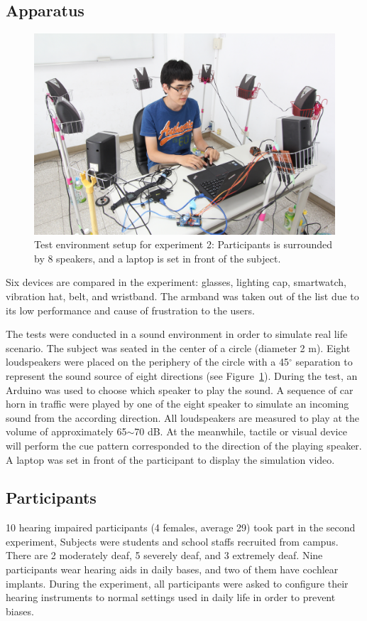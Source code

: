 \documentclass{sigchi}
\begin{document}
\subsection{Apparatus}

\begin{figure}[!t]
\centering
\includegraphics[width=0.9\columnwidth]{Speakers}
\caption{Test environment setup for experiment 2: Participants is surrounded by 8 speakers, and a laptop is set in front of the subject.}
\label{fig:speakers}
\end{figure}
Six devices are compared in the experiment: glasses, lighting cap, smartwatch, vibration hat, belt, and wristband. The armband was taken out of the list due to its low performance and cause of frustration to the users.

The tests were conducted in a sound environment in order to simulate real life scenario. The subject was seated in the center of a circle (diameter 2 m). Eight loudspeakers were placed on the periphery of the circle with a 45$^\circ$ separation to represent the sound source of eight directions (see Figure~\ref{fig:speakers}). During the test, an Arduino was used to choose which speaker to play the sound. A sequence of car horn in traffic were played by one of the eight speaker to simulate an incoming sound from the according direction. All loudspeakers are measured to play at the volume of approximately 65$\sim$70 dB. At the meanwhile, tactile or visual device will perform the cue pattern corresponded to the direction of the playing speaker. A laptop was set in front of the participant to display the simulation video.

\subsection{Participants}
10 hearing impaired participants (4 females, average 29) took part in the second experiment, Subjects were students and school staffs recruited from campus. There are 2 moderately deaf, 5 severely deaf, and 3 extremely deaf. Nine participants wear hearing aids in daily bases, and two of them have cochlear implants. During the experiment, all participants were asked to configure their hearing instruments to normal settings used in daily life in order to prevent biases.
\end{document}
